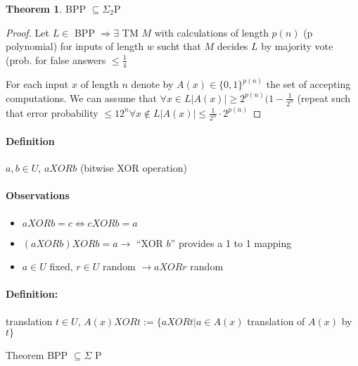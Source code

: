 \documentclass[11pt]{article}
\theoremstyle{definition}
\newtheorem{theorem}{Theorem}[section]
\theoremstyle{definition}
\begin{document}
\begin{theorem}
BPP $ \subseteq \Sigma_2 $P
\end{theorem}

\begin{proof}
Let $ L \in $ BPP $ \Rightarrow \exists $ TM $ M $ with calculations of length $ p(n) $ (p polynomial) for inputs of length $ w $ sucht that $ M $ decides $ L $ by majority vote (prob. for false answers $ \leq \frac{1}{4} $

For each input $ x $ of length $ n $ denote by $ A (x) \in \{0,1\}^{p(n)} $ the set of accepting computations. We can assume that $ \forall x \in L |A(x)| \geq 2^{p(n)} (1 - \frac{1}{2^n} $ (repeat such that error probability $ \leq {1}{2^n} \forall x \not \in L | A(x) | \leq \frac{1}{2^n} \cdot 2^{p(n)} $

\end{proof}

\paragraph{Definition} $ a, b \in U $, $ a XOR b $ (bitwise XOR operation)

\paragraph{Observations}
\begin{itemize}
\item $ a XOR b = c \Leftrightarrow c XOR b = a $
\item $ (a XOR b) XOR b = a \rightarrow $ ``XOR $ b $'' provides a 1 to 1 mapping
\item $ a \in U $ fixed, $ r \in U $ random $ \rightarrow a XOR r $ random
\end{itemize}

\paragraph{Definition:} translation $ t \in U $, $ A(x) XOR t:= \{ a XOR t | a \in A(x) $ translation of $ A(x) $ by $ t \} $




Theorem BPP $ \subseteq \Sigma $ P %

\end{document}
